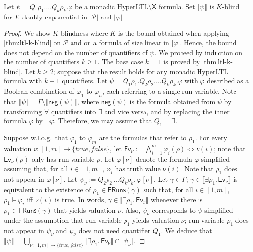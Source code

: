 \documentclass[10pt,a4paper]{article}
\renewcommand{\geq}{\geqslant}
\newcommand{\set}[1]{\{#1\}}
\newcommand{\nset}[2]{[#1,#2]}
\newcommand{\deff}{:=}
\newcommand{\size}[1]{|#1|}
\newcommand{\prot}{\mathcal{P}}
\newcommand{\atrace}{\run}
\newcommand{\fairrunsfrom}[1]{\mathsf{FRuns}(#1)}
\newcommand{\config}{\gamma}
\newcommand{\configs}{\Gamma}
\newcommand{\run}{\rho}
\newcommand{\aquantif}{Q}
\newcommand{\satset}[1]{\llbracket {#1} \rrbracket}
\newcommand{\ltlnext}{\mathsf{X}}
\newcommand{\true}{\mathit{true}}
\newcommand{\false}{\mathit{false}}
\newcommand{\hyperneg}[1]{\mathsf{neg}(#1)}
\newcommand{\simplify}[2]{#1[#2]} %
\begin{document}
\begin{lemma}
	\label{thm:full-k-blind}
	Let \(\psi= \aquantif_1 \run_1.
	\ldots \aquantif_k \run_k. \varphi\) be a monadic HyperLTL\(\setminus \ltlnext\) formula.
	Set \(\satset{\psi}\) is \(K\)-blind for \(K\) doubly-exponential in \(\size{\prot}\) and \(\size{\varphi}\).
\end{lemma}
\begin{proof}
	We show \(K\)-blindness where \(K\) is the bound obtained when applying \cref{thm:ltl-k-blind} on \(\prot\) and on a formula of size linear in \(\size{\varphi}\).
	Hence, the bound does not depend on the number of quantifiers of \(\psi\).
	We proceed by induction on the number of quantifiers \(k \geq 1\).
	The base case \(k=1\) is proved by \cref{thm:ltl-k-blind}.
	Let \(k \geq 2\); suppose that the result holds for any monadic HyperLTL formula with \(k-1\) quantifiers.
	Let \(\psi = \aquantif_1 \run_1.
	\aquantif_2 \run_2. \ldots \aquantif_k \run_k. \varphi\) with \(\varphi\) described as a Boolean combination of \(\varphi_1\) to \(\varphi_n\), each referring to a single run variable.
	Note that \(\satset{\psi} = \configs \setminus \satset{\hyperneg{\psi}}\), where \(\hyperneg{\psi}\) is the formula obtained from \(\psi\) by transforming \(\forall\) quantifiers into \(\exists\) and vice versa, and by replacing the inner formula \(\varphi\) by \(\neg \varphi\).
	Therefore, we may assume that \(\aquantif_1 = \exists\).

	Suppose w.l.o.g.\ that \(\varphi_1\) to \(\varphi_m\) are the formulas that refer to \(\run_1\).
	For every valuation \(\nu: \nset{1}{m} \rightarrow \set{\true,\false}\), let \(\mathsf{Ev}_{\nu} \deff \bigwedge_{i=1}^m \varphi_i(\atrace) \Leftrightarrow \nu(i)\); note that \(\mathsf{Ev}_{\nu}(\run)\) only has run variable \(\run\).
	Let \(\simplify{\varphi}{\nu}\) denote the formula \(\varphi\) simplified assuming that, for all \(i \in \nset{1}{m}\), \(\varphi_i\) has truth value \(\nu(i)\).
	Note that \(\run_1\) does not appear in \(\simplify{\varphi}{\nu}\).
	Let \(\psi_\nu \deff \aquantif_2 \atrace_2 \, \ldots \aquantif_k \atrace_k .
	\, \simplify{\varphi}{\nu}\).
	Let \(\config \in \configs\); \(\config \in \satset{\exists \run_1 .
		\, \mathsf{Ev}_{\nu}}\) is equivalent to the existence of \(\run_1 \in \fairrunsfrom{\config}\) such that, for all \(i \in \nset{1}{m}\), \(\run_1 \models \varphi_i\) iff \(\nu(i)\) is true.
	In words, \(\config \in \satset{\exists \run_1 .
		\, \mathsf{Ev}_{\nu}}\) whenever there is \(\run_1 \in \fairrunsfrom{\config}\) that yields valuation \(\nu\).
	Also, \(\psi_\nu\) corresponds to \(\psi\) simplified under the assumption that run variable \(\run_1\) yields valuation \(\nu\); run variable \(\run_1\) does not appear in \(\psi_\nu\) and \(\psi_\nu\) does not need quantifier \(\aquantif_1\).
	We deduce that \(\satset{\psi} = \bigcup_{\nu: \nset{1}{m} \rightarrow \set{\true,\false}} \satset{\exists \run_1 .
		\, \mathsf{Ev}_{\nu}} \cap
	\satset{\psi_\nu}.\)


\end{proof}
\end{document}
